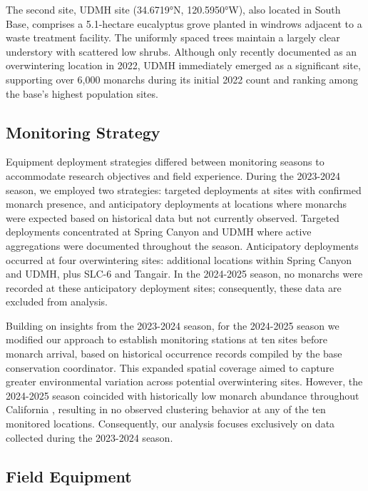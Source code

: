 The second site, UDMH site (34.6719°N, 120.5950°W), also located in South Base, comprises a 5.1-hectare eucalyptus grove planted in windrows adjacent to a waste treatment facility. The uniformly spaced trees maintain a largely clear understory with scattered low shrubs. Although only recently documented as an overwintering location in 2022, UDMH immediately emerged as a significant site, supporting over 6,000 monarchs during its initial 2022 count and ranking among the base's highest population sites.


\subsection{Monitoring Strategy}

Equipment deployment strategies differed between monitoring seasons to accommodate research objectives and field experience. During the 2023-2024 season, we employed two strategies: targeted deployments at sites with confirmed monarch presence, and anticipatory deployments at locations where monarchs were expected based on historical data but not currently observed. Targeted deployments concentrated at Spring Canyon and UDMH where active aggregations were documented throughout the season. Anticipatory deployments occurred at four overwintering sites: additional locations within Spring Canyon and UDMH, plus SLC-6 and Tangair. In the 2024-2025 season, no monarchs were recorded at these anticipatory deployment sites; consequently, these data are excluded from analysis.

Building on insights from the 2023-2024 season, for the 2024-2025 season we modified our approach to establish monitoring stations at ten sites before monarch arrival, based on historical occurrence records compiled by the base conservation coordinator. This expanded spatial coverage aimed to capture greater environmental variation across potential overwintering sites. However, the 2024-2025 season coincided with historically low monarch abundance throughout California \parencite{xercessocietyWesternMonarchButterfly2025}, resulting in no observed clustering behavior at any of the ten monitored locations. Consequently, our analysis focuses exclusively on data collected during the 2023-2024 season.

\subsection{Field Equipment}

